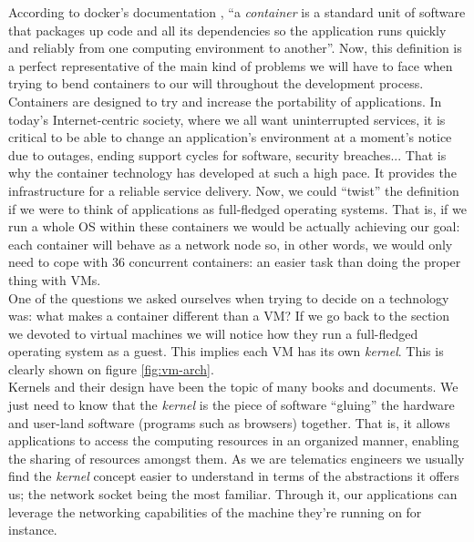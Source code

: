                 According to docker's documentation \cite{bib:docker-doc}, ``a \textit{container} is a standard unit of software that packages up code and all its dependencies so the application runs quickly and reliably from one computing environment to another''. Now, this definition is a perfect representative of the main kind of problems we will have to face when trying to bend containers to our will throughout the development process. Containers are designed to try and increase the portability of applications. In today's Internet-centric society, where we all want uninterrupted services, it is critical to be able to change an application's environment at a moment's notice due to outages, ending support cycles for software, security breaches... That is why the container technology has developed at such a high pace. It provides the infrastructure for a reliable service delivery. Now, we could ``twist'' the definition if we were to think of applications as full-fledged operating systems. That is, if we run a whole OS within these containers we would be actually achieving our goal: each container will behave as a network node so, in other words, we would only need to cope with $36$ concurrent containers: an easier task than doing the proper thing with VMs.\\

                One of the questions we asked ourselves when trying to decide on a technology was: what makes a container different than a VM? If we go back to the section we devoted to virtual machines we will notice how they run a full-fledged operating system as a guest. This implies each VM has its own \textit{kernel}. This is clearly shown on figure \ref{fig:vm-arch}.\\

                Kernels and their design have been the topic of many books and documents. We just need to know that the \textit{kernel} is the piece of software ``gluing'' the hardware and user-land software (programs such as browsers) together. That is, it allows applications to access the computing resources in an organized manner, enabling the sharing of resources amongst them. As we are telematics engineers we usually find the \textit{kernel} concept easier to understand in terms of the abstractions it offers us; the network socket being the most familiar. Through it, our applications can leverage the networking capabilities of the machine they're running on for instance.\\

